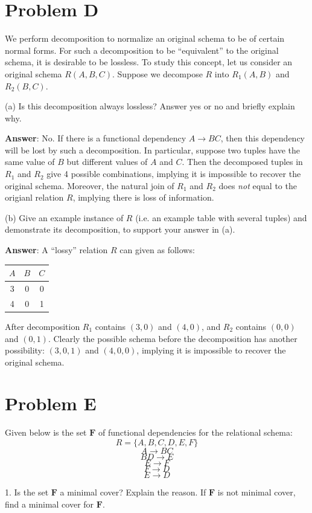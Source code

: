 \documentclass{article}
\begin{document}
\section{Problem D}
We perform decomposition to normalize an original schema to be of certain normal forms. For such a decomposition to be ``equivalent'' to the original schema, it is desirable to be lossless. To study this concept, let us consider an original schema $R(A, B, C)$. Suppose we decompose $R$ into $R_1 (A, B)$ and $R_2 (B, C)$.

(a) Is this decomposition always lossless? Answer yes or no and briefly explain why.

{\bf Answer}: No. If there is a functional dependency $A \to BC$, then this dependency will be lost by such a decomposition. In particular, suppose two tuples have the same value of $B$ but different values of $A$ and $C$. Then the decomposed tuples in $R_1$ and $R_2$ give 4 possible combinations, implying it is impossible to recover the original schema. Moreover, the natural join of $R_1$ and $R_2$ does \emph{not} equal to the origianl relation $R$, implying there is loss of information.

(b) Give an example instance of $R$ (i.e. an example table with several tuples) and demonstrate its decomposition, to support your answer in (a).

{\bf Answer}: A ``lossy'' relation $R$ can given as follows:

\begin{tabular}{c c c}
$A$ & $B$ & $C$ \\
\hline
3 & 0 & 0 \\
4 & 0 & 1 \\
\end{tabular}

After decomposition $R_1$ contains $(3, 0)$ and $(4, 0)$, and $R_2$ contains $(0, 0)$ and $(0, 1)$.
Clearly the possible schema before the decomposition has another possibility: $(3, 0, 1)$ and $(4, 0, 0)$, implying it is impossible to recover the original schema.

\section{Problem E}
Given below is the set $\mathbf{F}$ of functional dependencies for the relational schema:
$$R = \{A, B, C, D, E, F\}$$
$$A \to BC$$
$$BD \to E$$
$$E \to F$$
$$F \to D$$
$$E \to D$$

1. Is the set $\mathbf{F}$ a minimal cover? Explain the reason. If $\mathbf{F}$ is not minimal cover, find a minimal cover for $\mathbf{F}$.
\end{document}
